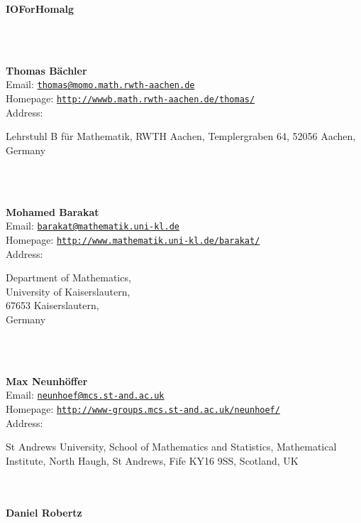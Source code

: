 \documentclass[a4paper,11pt]{report}
\newcommand{\maintitlesize}{\fontsize{50}{55}\selectfont}
\begin{document}
\begin{titlepage}
\begin{center}{\maintitlesize \textbf{\textsf{IO{\textunderscore}ForHomalg}\mbox{}}}
\end{center}\vfill

\mbox{}\\
{\mbox{}\\
\small \noindent \textbf{Thomas B{\"a}chler\\
    }  Email: \href{mailto://thomas@momo.math.rwth-aachen.de} {\texttt{thomas@momo.math.rwth-aachen.de}}\\
  Homepage: \href{http://wwwb.math.rwth-aachen.de/~thomas/} {\texttt{http://wwwb.math.rwth-aachen.de/\texttt{}thomas/}}\\
  Address: \begin{minipage}[t]{8cm}\noindent
 Lehrstuhl B f{\"u}r Mathematik, RWTH Aachen, Templergraben 64, 52056 Aachen,
Germany \end{minipage}
}\\
{\mbox{}\\
\small \noindent \textbf{Mohamed Barakat\\
    }  Email: \href{mailto://barakat@mathematik.uni-kl.de} {\texttt{barakat@mathematik.uni-kl.de}}\\
  Homepage: \href{http://www.mathematik.uni-kl.de/~barakat/} {\texttt{http://www.mathematik.uni-kl.de/\texttt{}barakat/}}\\
  Address: \begin{minipage}[t]{8cm}\noindent
 Department of Mathematics, \\
 University of Kaiserslautern, \\
 67653 Kaiserslautern, \\
 Germany \end{minipage}
}\\
{\mbox{}\\
\small \noindent \textbf{Max Neunh{\"o}ffer\\
    }  Email: \href{mailto://neunhoef@mcs.st-and.ac.uk} {\texttt{neunhoef@mcs.st-and.ac.uk}}\\
  Homepage: \href{http://www-groups.mcs.st-and.ac.uk/~neunhoef/} {\texttt{http://www-groups.mcs.st-and.ac.uk/\texttt{}neunhoef/}}\\
  Address: \begin{minipage}[t]{8cm}\noindent
 St Andrews University, School of Mathematics and Statistics, Mathematical
Institute, North Haugh, St Andrews, Fife KY16 9SS, Scotland, UK \end{minipage}
}\\
{\mbox{}\\
\small \noindent \textbf{Daniel Robertz\\
}}
\end{titlepage}
\end{document}
